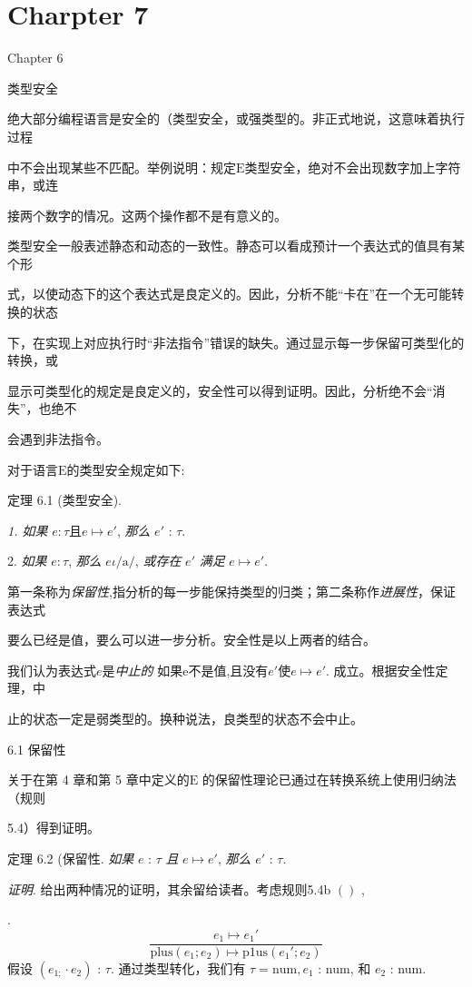 \section{Charpter 7}
Chapter 6

类型安全

绝大部分编程语言是安全的（类型安全，或强类型的。非正式地说，这意味着执行过程

中不会出现某些不匹配。举例说明：规定$\mathrm{E}$类型安全，绝对不会出现数字加上字符串，或连

接两个数字的情况。这两个操作都不是有意义的。

类型安全一般表述静态和动态的一致性。静态可以看成预计一个表达式的值具有某个形

式，以使动态下的这个表达式是良定义的。因此，分析不能“卡在”在一个无可能转换的状态

下，在实现上对应执行时“非法指令”错误的缺失。通过显示每一步保留可类型化的转换，或

显示可类型化的规定是良定义的，安全性可以得到证明。因此，分析绝不会“消失”，也绝不

会遇到非法指令。

对于语言$\mathrm{E}$的类型安全规定如下:

定理 6.1 (类型安全).

{\it 1. 如果} $e:\tau  且e\mapsto e'$, {\it 那么} $e'$ : $\tau.$

2. {\it 如果} $ e:\tau$, {\it 那么} $e\iota/\mathrm{a}/$, {\it 或存在} $e'$ {\it 满足} $e\mapsto e'.$

第一条称为{\it 保留性},指分析的每一步能保持类型的归类；第二条称作{\it 进展性}，保证表达式

要么已经是值，要么可以进一步分析。安全性是以上两者的结合。

我们认为表达式$e$是{\it 中止的} 如果e不是值,且没有$e'$使$e\mapsto e'$. 成立。根据安全性定理，中

止的状态一定是弱类型的。换种说法，良类型的状态不会中止。

6.1 保留性

关于在第 4 章和第 5 章中定义的$\mathrm{E}$ 的保留性理论已通过在转换系统上使用归纳法（规则


5.4）得到证明。

定理  6.2 (保留性. {\it 如果} $e$ : $\tau$ {\it 且} $e\mapsto e'$, {\it 那么} $e'$ : $\tau.$

{\it 证明}. 给出两种情况的证明，其余留给读者。考虑规则5.4b $()$ ,

.
$$
\frac{e_{1}\mapsto e_{1}'}{\mathrm{p}\mathrm{l}\mathrm{u}\mathrm{s}(e_{1};e_{2})\mapsto \mathrm{p}1\mathrm{u}\mathrm{s}(e_{1}';e_{2})}
$$
假设 $(e_{1;}\cdot e_{2})$ : $\tau$. 通过类型转化，我们有 $\tau=\mathrm{n}\mathrm{u}\mathrm{m}, e_{1}$ : num, 和 $e_{2}$ : num.

